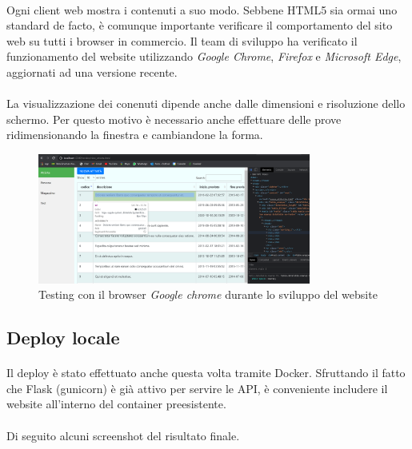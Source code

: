 \documentclass[11pt,a4paper,english]{article}
\begin{document}
\paragraph{} Ogni client web mostra i contenuti a suo modo. Sebbene HTML5 sia ormai uno standard de facto, è comunque importante verificare il comportamento del sito web su tutti i browser in commercio. Il team di sviluppo ha verificato il funzionamento del website utilizzando \emph{Google Chrome}, \emph{Firefox} e \emph{Microsoft Edge}, aggiornati ad una versione recente.

\paragraph{} La visualizzazione dei conenuti dipende anche dalle dimensioni e risoluzione dello schermo. Per questo motivo è necessario anche effettuare delle prove ridimensionando la finestra e cambiandone la forma. 

\begin{figure}[H]
    \centering
    \includegraphics[width=0.8\textwidth]{img/prova_chrome.png}
    \caption{Testing con il browser \emph{Google chrome} durante lo sviluppo del website}
\end{figure}


\subsection{Deploy locale}

\paragraph{} Il deploy è stato effettuato anche questa volta tramite Docker. Sfruttando il fatto che Flask (gunicorn) è già attivo per servire le API, è conveniente includere il website all'interno del container preesistente. 

\paragraph{} Di seguito alcuni screenshot del risultato finale. 
\end{document}

